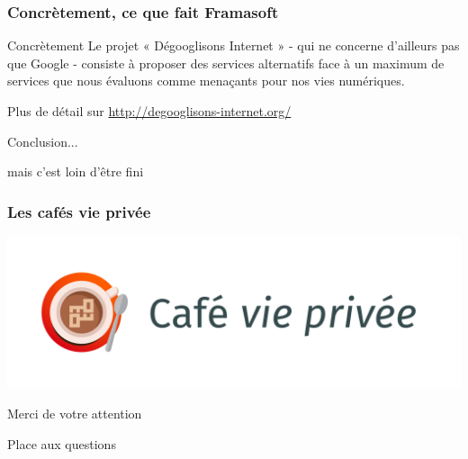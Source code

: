 \documentclass{beamer}
\begin{document}
\begin{frame}
\frametitle{Concrètement, ce que fait Framasoft}

\begin{block}{Concrètement}
Le projet « Dégooglisons Internet » - qui ne concerne d'ailleurs pas que Google - consiste à proposer des services alternatifs face à un maximum de services que nous évaluons comme menaçants pour nos vies numériques.
\end{block}
Plus de détail sur \url{http://degooglisons-internet.org/}
\end{frame}

\begin{frame}
\Huge{\centerline{Conclusion...}}
\Huge{\centerline{mais c'est loin d'être fini}}
\end{frame}

\begin{frame}
\frametitle{Les cafés vie privée}

\begin{center}
\includegraphics[scale=0.4]{./images/LogoCafeViePrivee.jpg}
\end{center}
\end{frame}

\begin{frame}
\Huge{\centerline{Merci de votre attention}}
\Huge{\centerline{Place aux questions}}
\end{frame}
\end{document}
